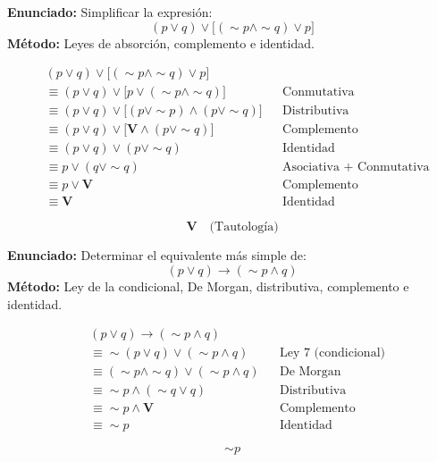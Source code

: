 \begin{cajaejemplo}
  \textbf{Enunciado:} Simplificar la expresión:
  \[
    (p \vee q) \vee \bigl[(\sim p \wedge \sim q) \vee p\bigr]
  \]
  \noindent\textbf{Método:} Leyes de absorción, complemento e identidad.
  \medskip

  \begin{align*}
    &(p \vee q) \vee \bigl[(\sim p \wedge \sim q) \vee p\bigr] \\[4pt]
    &\equiv (p \vee q) \vee \bigl[p \vee (\sim p \wedge \sim q)\bigr]
      && \text{Conmutativa} \\[4pt]
    &\equiv (p \vee q) \vee \bigl[(p \vee \sim p) \wedge (p \vee \sim q)\bigr]
      && \text{Distributiva} \\[4pt]
    &\equiv (p \vee q) \vee \bigl[\mathbf{V} \wedge (p \vee \sim q)\bigr]
      && \text{Complemento} \\[4pt]
    &\equiv (p \vee q) \vee (p \vee \sim q)
      && \text{Identidad} \\[4pt]
    &\equiv p \vee (q \vee \sim q)
      && \text{Asociativa + Conmutativa} \\[4pt]
    &\equiv p \vee \mathbf{V}
      && \text{Complemento} \\[4pt]
    &\equiv \mathbf{V}
      && \text{Identidad}
  \end{align*}
  \begin{tcolorbox}[colback=AzulClaro!50, colframe=AzulPizarra,
    arc=2pt, boxrule=0.7pt]
    \[ \boxed{\mathbf{V} \quad \text{(Tautolog\'{i}a)}} \]
  \end{tcolorbox}
\end{cajaejemplo}

\begin{cajaejemplo}
  \textbf{Enunciado:} Determinar el equivalente más simple de:
  \[
    (p \vee q) \rightarrow (\sim p \wedge q)
  \]
  \noindent\textbf{Método:} Ley de la condicional, De Morgan, distributiva,
  complemento e identidad.
  \medskip

  \begin{align*}
    &(p \vee q) \rightarrow (\sim p \wedge q) \\[4pt]
    &\equiv \sim(p \vee q) \vee (\sim p \wedge q)
      && \text{Ley 7 (condicional)} \\[4pt]
    &\equiv (\sim p \wedge \sim q) \vee (\sim p \wedge q)
      && \text{De Morgan} \\[4pt]
    &\equiv \sim p \wedge (\sim q \vee q)
      && \text{Distributiva} \\[4pt]
    &\equiv \sim p \wedge \mathbf{V}
      && \text{Complemento} \\[4pt]
    &\equiv \sim p
      && \text{Identidad}
  \end{align*}
  \begin{tcolorbox}[colback=AzulClaro!50, colframe=AzulPizarra,
    arc=2pt, boxrule=0.7pt]
    \[ \boxed{\sim p} \]
  \end{tcolorbox}
\end{cajaejemplo}

